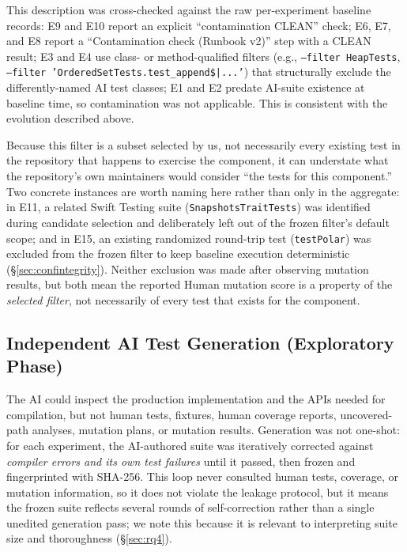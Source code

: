 \documentclass[10pt,conference]{IEEEtran}
\begin{document}
This description was cross-checked against the raw per-experiment baseline records: E9 and E10 report an explicit ``contamination CLEAN'' check; E6, E7, and E8 report a ``Contamination check (Runbook v2)'' step with a CLEAN result; E3 and E4 use class- or method-qualified filters (e.g., \texttt{--filter HeapTests}, \texttt{--filter 'OrderedSetTests.test\_append\$|...'}) that structurally exclude the differently-named AI test classes; E1 and E2 predate AI-suite existence at baseline time, so contamination was not applicable. This is consistent with the evolution described above.

Because this filter is a subset selected by us, not necessarily every existing test in the repository that happens to exercise the component, it can understate what the repository's own maintainers would consider ``the tests for this component.'' Two concrete instances are worth naming here rather than only in the aggregate: in E11, a related Swift Testing suite (\texttt{SnapshotsTraitTests}) was identified during candidate selection and deliberately left out of the frozen filter's default scope; and in E15, an existing randomized round-trip test (\texttt{testPolar}) was excluded from the frozen filter to keep baseline execution deterministic (\S\ref{sec:confintegrity}). Neither exclusion was made after observing mutation results, but both mean the reported Human mutation score is a property of the \emph{selected filter}, not necessarily of every test that exists for the component.

\subsection{Independent AI Test Generation (Exploratory Phase)}
\label{sec:aigen}
The AI could inspect the production implementation and the APIs needed for compilation, but not human tests, fixtures, human coverage reports, uncovered-path analyses, mutation plans, or mutation results. Generation was not one-shot: for each experiment, the AI-authored suite was iteratively corrected against \emph{compiler errors and its own test failures} until it passed, then frozen and fingerprinted with SHA-256. This loop never consulted human tests, coverage, or mutation information, so it does not violate the leakage protocol, but it means the frozen suite reflects several rounds of self-correction rather than a single unedited generation pass; we note this because it is relevant to interpreting suite size and thoroughness (\S\ref{sec:rq4}).
\end{document}
